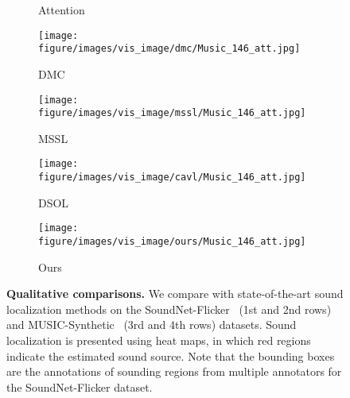 \begin{figure*}[t!]
\begin{subfigure}[b]{.16\linewidth}
    \caption{Attention~\cite{av_cvpr18_lls}}
    \end{subfigure}
    \begin{subfigure}[b]{.16\linewidth}
    \centering
    \texttt{[image: figure/images/vis\_image/dmc/Music\_146\_att.jpg]}
    \caption{DMC~\cite{av_cvpr19_deep_cluster}}
    \end{subfigure}  
    \begin{subfigure}[b]{.16\linewidth}
    \centering
    \texttt{[image: figure/images/vis\_image/mssl/Music\_146\_att.jpg]}
    \caption{MSSL~\cite{av_eccv20_mms_loc}}
    \end{subfigure}
    \begin{subfigure}[b]{.16\linewidth}
    \centering
    \texttt{[image: figure/images/vis\_image/cavl/Music\_146\_att.jpg]}
    \caption{DSOL~\cite{av_nips20_loc}}
    \end{subfigure}
    \begin{subfigure}[b]{.16\linewidth}
    \centering
    \texttt{[image: figure/images/vis\_image/ours/Music\_146\_att.jpg]}
    \caption{Ours}
    \end{subfigure}
  \caption{\textbf{Qualitative comparisons.} 
  We compare with state-of-the-art sound localization methods on the SoundNet-Flicker~\cite{av_cvpr18_lls,av_tpami20_lls}  (1st and 2nd rows) and MUSIC-Synthetic~\cite{av_nips20_loc} (3rd and 4th rows) datasets. 
  Sound localization is presented using heat maps, in which red regions indicate the estimated sound source.
  Note that the bounding boxes are the annotations of sounding regions from multiple annotators for the SoundNet-Flicker dataset. 
  }\label{fig:vis}
  \vspace{\figmargin}
\end{figure*}
